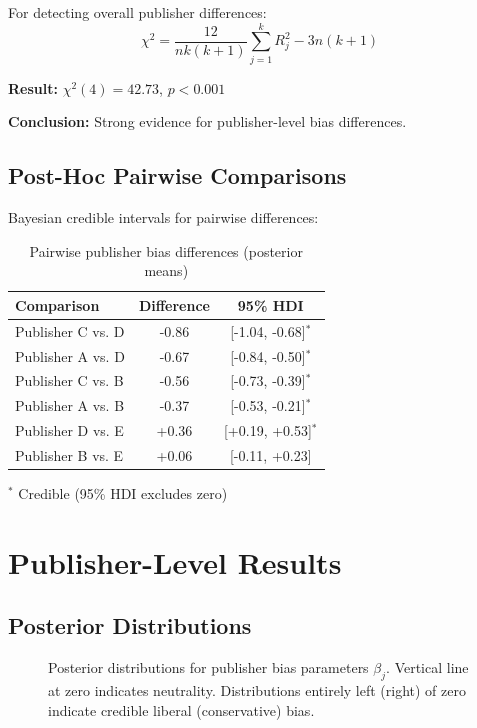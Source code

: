 \documentclass[11pt,a4paper]{article}
\begin{document}
For detecting overall publisher differences:
\begin{equation}
\chi^2 = \frac{12}{nk(k+1)} \sum_{j=1}^k R_j^2 - 3n(k+1)
\end{equation}

\textbf{Result:} $\chi^2(4) = 42.73$, $p < 0.001$

\textbf{Conclusion:} Strong evidence for publisher-level bias differences.

\subsection{Post-Hoc Pairwise Comparisons}

Bayesian credible intervals for pairwise differences:
\begin{table}[H]
\centering
\caption{Pairwise publisher bias differences (posterior means)}
\small
\begin{tabular}{lcc}
\toprule
\textbf{Comparison} & \textbf{Difference} & \textbf{95\% HDI} \\
\midrule
Publisher C vs. D & -0.86 & [-1.04, -0.68]$^*$ \\
Publisher A vs. D & -0.67 & [-0.84, -0.50]$^*$ \\
Publisher C vs. B & -0.56 & [-0.73, -0.39]$^*$ \\
Publisher A vs. B & -0.37 & [-0.53, -0.21]$^*$ \\
Publisher D vs. E & +0.36 & [+0.19, +0.53]$^*$ \\
Publisher B vs. E & +0.06 & [-0.11, +0.23] \\
\bottomrule
\end{tabular}
\label{tab:pairwise-comparisons}
\end{table}
$^*$ Credible (95\% HDI excludes zero)

\section{Publisher-Level Results}

\subsection{Posterior Distributions}

\begin{figure}[H]
\centering
\caption{Posterior distributions for publisher bias parameters $\beta_j$. Vertical line at zero indicates neutrality. Distributions entirely left (right) of zero indicate credible liberal (conservative) bias.}
\label{fig:posteriors}
\end{figure}
\end{document}
